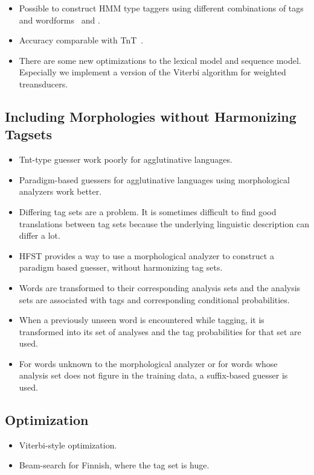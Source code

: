 \documentclass{llncs}
\begin{document}
\begin{itemize}
\item Possible to construct HMM type taggers using different
  combinations of tags and wordforms~\cite{Silfverberg/2010/IceTal}
  and \cite{Silfverberg/2011}.
\item Accuracy comparable with TnT~\cite{Brants:2000}.
\item There are some new optimizations to the lexical model and
  sequence model. Especially we implement a version of the Viterbi
  algorithm for weighted treansducers.
\end{itemize}


\subsection{Including Morphologies without Harmonizing Tagsets}

\begin{itemize}
\item Tnt-type guesser work poorly for agglutinative languages.
\item Paradigm-based guessers for agglutinative languages using
  morphological analyzers work better.
\item Differing tag sets are a problem. It is sometimes difficult to
  find good translations between tag sets because the underlying
  linguistic description can differ a lot.
\item HFST provides a way to use a morphological analyzer to construct
  a paradigm based guesser, without harmonizing tag sets.
\item Words are transformed to their corresponding analysis sets and
  the analysis sets are associated with tags and corresponding
  conditional probabilities.
\item When a previously unseen word is encountered while tagging, it
  is transformed into its set of analyses and the tag probabilities
  for that set are used.
\item For words unknown to the morphological analyzer or for words
  whose analysis set does not figure in the training data, a
  suffix-based guesser is used.
\end{itemize}

\subsection{Optimization}
\begin{itemize}
\item Viterbi-style optimization.
\item Beam-search for Finnish, where the tag set is huge.
\end{itemize}
\end{document}
